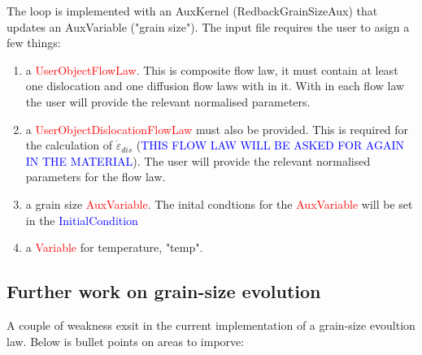 \documentclass[]{scrreprt}
\begin{document}
The loop is implemented with an AuxKernel (RedbackGrainSizeAux) that updates an AuxVariable ("grain size"). The input file requires the user to asign a few things:\\

\begin{enumerate} 

\item a \textcolor{red}{UserObjectFlowLaw}. This is composite flow law, it must contain at least one dislocation and one diffusion flow laws with in it. With in each flow law the user will provide the relevant normalised parameters.
\item a \textcolor{red}{UserObjectDislocationFlowLaw} must also be provided. This is required for the calculation of $\dot{\varepsilon}_{dis}$ (\textcolor{blue}{THIS FLOW LAW WILL BE ASKED FOR AGAIN IN THE MATERIAL}). The user will provide the relevant normalised parameters for the flow law.  
\item a grain size \textcolor{red}{AuxVariable}. The inital condtions for the \textcolor{red}{AuxVariable} will be set in the \textcolor{blue}{InitialCondition}
\item a \textcolor{red}{Variable} for temperature, "temp". 


\end{enumerate}

\subsection{Further work on grain-size evolution}
\label{subsection:further_work}

A couple of weakness exsit in the current implementation of a grain-size evoultion law. Below is bullet points on areas to imporve:
\end{document}
